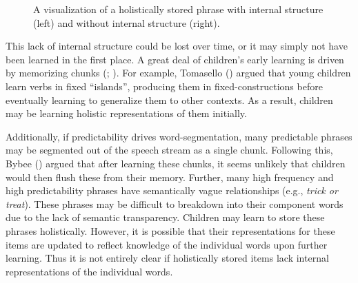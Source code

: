 \documentclass[
  12pt,
  letterpaper,
]{scrreprt}
\begin{document}
\begin{figure}[htbp]

\caption{\label{fig-nointernalstructure}A visualization of a
holistically stored phrase with internal structure (left) and without
internal structure (right).}


\end{figure}%

This lack of internal structure could be lost over time, or it may
simply not have been learned in the first place. A great deal of
children's early learning is driven by memorizing chunks
(;
). For example, Tomasello
()
argued that young children learn verbs in fixed ``islands'', producing
them in fixed-constructions before eventually learning to generalize
them to other contexts. As a result, children may be learning holistic
representations of them initially.

Additionally, if predictability drives word-segmentation, many
predictable phrases may be segmented out of the speech stream as a
single chunk. Following this, Bybee ()
argued that after learning these chunks, it seems unlikely that children
would then flush these from their memory. Further, many high frequency
and high predictability phrases have semantically vague relationships
(e.g., \emph{trick or treat}). These phrases may be difficult to
breakdown into their component words due to the lack of semantic
transparency. Children may learn to store these phrases holistically.
However, it is possible that their representations for these items are
updated to reflect knowledge of the individual words upon further
learning. Thus it is not entirely clear if holistically stored items
lack internal representations of the individual words.
\end{document}
